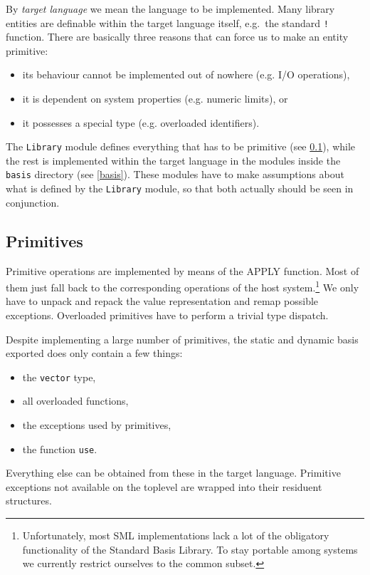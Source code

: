 \documentclass[twoside,titlepage]{article}
\begin{document}
By {\em target language} we mean the language to be implemented. Many library entities are definable within the target language itself, e.g.\ the standard {\tt !} function. There are basically three reasons that can force us to make an entity primitive:

\begin{itemize}
\setlength{\parskip}{0ex}
\item its behaviour cannot be implemented out of nowhere (e.g. I/O operations),
\item it is dependent on system properties (e.g. numeric limits), or
\item it possesses a special type (e.g. overloaded identifiers).
\end{itemize}

The {\tt Library} module defines everything that has to be primitive (see \ref{primitives}), while the rest is implemented within the target language in the modules inside the {\tt basis} directory (see \ref{basis}). These modules have to make assumptions about what is defined by the {\tt Library} module, so that both actually should be seen in conjunction.


\subsection{Primitives}
\label{primitives}

Primitive operations are implemented by means of the APPLY function. Most of them just fall back to the corresponding operations of the host system.\footnote{Unfortunately, most SML implementations lack a lot of the obligatory functionality of the Standard Basis Library. To stay portable among systems we currently restrict ourselves to the common subset.} We only have to unpack and repack the value representation and remap possible exceptions. 
Overloaded primitives have to perform a trivial type dispatch.

Despite implementing a large number of primitives, the static and dynamic basis exported does only contain a few things:
\begin{itemize}
\setlength{\parskip}{0ex}
\item the {\tt vector} type,
\item all overloaded functions,
\item the exceptions used by primitives,
\item the function {\tt use}.
\end{itemize}
Everything else can be obtained from these in the target language. Primitive exceptions not available on the toplevel are wrapped into their residuent structures.
\end{document}
